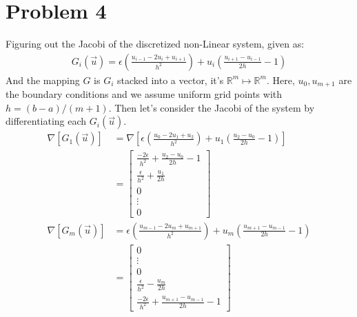 \documentclass[]{article}
\begin{document}
\section*{Problem 4}
    Figuring out the Jacobi of the discretized non-Linear system, given as: 
    \begin{align*}\tag{4.1}\label{eqn:4.1}
        G_i(\vec{u}) = \epsilon \left(
            \frac{u_{i - 1} - 2u_i + u_{i + 1}}{h^2}
        \right) + 
        u_i \left(
            \frac{u_{i + 1} - u_{i - 1}}{2h} - 1
        \right)
    \end{align*}
    And the mapping $G$ is $G_i$ stacked into a vector, it's $\mathbb{R}^m \mapsto \mathbb{R}^m$. Here, $u_{0}, u_{m + 1}$ are the boundary conditions and we assume uniform grid points with $h = (b - a)/(m + 1)$. Then let's consider the Jacobi of the system by differentiating each $G_i(\vec{u})$. 
    \begin{align*}\tag{4.2}\label{eqn:4.2}
        \nabla[G_1(\vec{u})] &= 
        \nabla 
        \left[
            \epsilon \left(
            \frac{u_{0} - 2u_1 + u_{2}}{h^2}
            \right) + 
            u_1 \left(
                \frac{u_{2} - u_{0}}{2h} - 1
            \right)
        \right]
        \\
        &= \begin{bmatrix}
            \frac{-2\epsilon}{h^2} + \frac{u_2 - u_0}{2h} - 1
            \\[0.5em]
            \frac{\epsilon}{h^2} + \frac{u_1}{2h}
            \\[0.5em]
            0
            \\[0.5em]
            \vdots 
            \\[0.5em]
            0
        \end{bmatrix}
        \\
        \nabla[G_m(\vec{u})] &= 
        \epsilon \left(
            \frac{u_{m - 1} - 2u_m + u_{m + 1}}{h^2}
        \right) + u_m \left(
            \frac{u_{m + 1} - u_{m - 1}}{2h} - 1
        \right)
        \\
        &= 
        \begin{bmatrix}
            0
            \\[0.5em]
            \vdots 
            \\[0.5em]
            0
            \\[0.5em]
            \frac{\epsilon}{h^2} - \frac{u_m}{2h}
            \\[0.5em]
            \frac{-2\epsilon}{h^2} + \frac{u_{m + 1} - u_{m - 1}}{2h} - 1
        \end{bmatrix}
    \end{align*}
\end{document}
